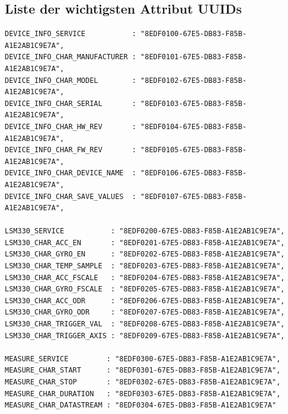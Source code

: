 \subsection{Liste der wichtigsten Attribut UUIDs}
\begin{lstlisting}
DEVICE_INFO_SERVICE           : "8EDF0100-67E5-DB83-F85B-A1E2AB1C9E7A",
DEVICE_INFO_CHAR_MANUFACTURER : "8EDF0101-67E5-DB83-F85B-A1E2AB1C9E7A",
DEVICE_INFO_CHAR_MODEL        : "8EDF0102-67E5-DB83-F85B-A1E2AB1C9E7A",
DEVICE_INFO_CHAR_SERIAL       : "8EDF0103-67E5-DB83-F85B-A1E2AB1C9E7A",
DEVICE_INFO_CHAR_HW_REV       : "8EDF0104-67E5-DB83-F85B-A1E2AB1C9E7A",
DEVICE_INFO_CHAR_FW_REV       : "8EDF0105-67E5-DB83-F85B-A1E2AB1C9E7A",
DEVICE_INFO_CHAR_DEVICE_NAME  : "8EDF0106-67E5-DB83-F85B-A1E2AB1C9E7A",
DEVICE_INFO_CHAR_SAVE_VALUES  : "8EDF0107-67E5-DB83-F85B-A1E2AB1C9E7A",

LSM330_SERVICE           : "8EDF0200-67E5-DB83-F85B-A1E2AB1C9E7A",
LSM330_CHAR_ACC_EN       : "8EDF0201-67E5-DB83-F85B-A1E2AB1C9E7A",
LSM330_CHAR_GYRO_EN      : "8EDF0202-67E5-DB83-F85B-A1E2AB1C9E7A",
LSM330_CHAR_TEMP_SAMPLE  : "8EDF0203-67E5-DB83-F85B-A1E2AB1C9E7A",
LSM330_CHAR_ACC_FSCALE   : "8EDF0204-67E5-DB83-F85B-A1E2AB1C9E7A",
LSM330_CHAR_GYRO_FSCALE  : "8EDF0205-67E5-DB83-F85B-A1E2AB1C9E7A",
LSM330_CHAR_ACC_ODR      : "8EDF0206-67E5-DB83-F85B-A1E2AB1C9E7A",
LSM330_CHAR_GYRO_ODR     : "8EDF0207-67E5-DB83-F85B-A1E2AB1C9E7A",
LSM330_CHAR_TRIGGER_VAL  : "8EDF0208-67E5-DB83-F85B-A1E2AB1C9E7A",
LSM330_CHAR_TRIGGER_AXIS : "8EDF0209-67E5-DB83-F85B-A1E2AB1C9E7A",

MEASURE_SERVICE         : "8EDF0300-67E5-DB83-F85B-A1E2AB1C9E7A",
MEASURE_CHAR_START      : "8EDF0301-67E5-DB83-F85B-A1E2AB1C9E7A",
MEASURE_CHAR_STOP       : "8EDF0302-67E5-DB83-F85B-A1E2AB1C9E7A",
MEASURE_CHAR_DURATION   : "8EDF0303-67E5-DB83-F85B-A1E2AB1C9E7A",
MEASURE_CHAR_DATASTREAM : "8EDF0304-67E5-DB83-F85B-A1E2AB1C9E7A"
\end{lstlisting}